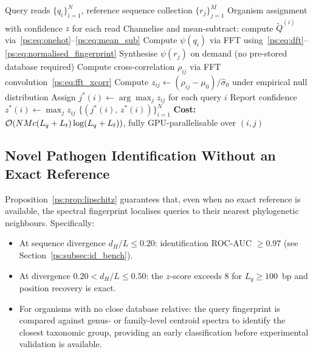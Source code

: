 \begin{algorithm}
\caption{Real-time pathogen identification}
\label{ps:alg:identification}
\begin{algorithmic}[1]
\Require Query reads $\{q_i\}_{i=1}^N$, reference sequence collection $\{r_j\}_{j=1}^M$
\Ensure Organism assignment with confidence $z$ for each read
  \State Channelise and mean-subtract: compute $\widetilde{Q}^{(i)}$ via~\eqref{ps:eq:onehot}--\eqref{ps:eq:mean_sub}
  \State Compute $\psi(q_i)$ via FFT using~\eqref{ps:eq:dft}--\eqref{ps:eq:normalised_fingerprint}
\EndFor
{}
  \State Synthesise $\psi(r_j)$ on demand (no pre-stored database required)
\EndFor
{}
  \State Compute cross-correlation $\rho_{ij}$ via FFT convolution~\eqref{ps:eq:fft_xcorr}
  \State Compute $z_{ij} \leftarrow (\rho_{ij} - \mu_0)/\hat{\sigma}_0$ under empirical null distribution
\EndFor
\State Assign $j^*(i) \leftarrow \arg\max_j z_{ij}$ for each query $i$
\State Report confidence $z^*(i) \leftarrow \max_j z_{ij}$
\State \Return $\{(j^*(i),\, z^*(i))\}_{i=1}^N$
\State \textbf{Cost:} $\mathcal{O}(N M c (L_q + L_t)\log(L_q + L_t))$, fully GPU-parallelisable over $(i,j)$
\end{algorithmic}
\end{algorithm}

\subsection{Novel Pathogen Identification Without an Exact Reference}

Proposition~\ref{ps:prop:lipschitz} guarantees that, even when no exact reference
is available, the spectral fingerprint localises queries to their nearest
phylogenetic neighbours. Specifically:
\begin{itemize}
\item At sequence divergence $d_H/L \leq 0.20$: identification ROC-AUC
  $\geq 0.97$ (see Section~\ref{ps:subsec:id_bench}).
\item At divergence $0.20 < d_H/L \leq 0.50$: the $z$-score exceeds 8 for
  $L_q \geq 100$~bp and position recovery is exact.
\item For organisms with no close database relative: the query fingerprint is
  compared against genus- or family-level centroid spectra to identify the
  closest taxonomic group, providing an early classification before experimental
  validation is available.
\end{itemize}

